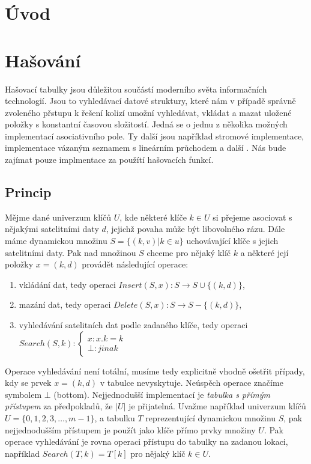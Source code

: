 
\chapter{Úvod}


\chapter{Hašování}
\label{sec:hashing}
Hašovací tabulky jsou důležitou součástí moderního světa informačních 
technologií. Jsou to vyhledávací datové struktury, které nám v případě
správně zvoleného přstupu k řešení kolizí umožní vyhledávat, vkládat a mazat uložené položky s konstantní
časovou složitostí. Jedná se o jednu z několika možných implementací
asociativního pole. Ty další jsou například stromové implementace, 
implementace vázaným seznamem s lineárním průchodem a další \cite{art_of_programming}. 
Nás bude zajímat pouze implmentace za použítí hašovacích funkcí.

\section{Princip}
Mějme dané univerzum klíčů $U$, kde některé klíče $k \in U$ si přejeme
asociovat s nějakými satelitními daty $d$, jejichž povaha může být libovolného rázu.
Dále máme dynamickou množinu $S = \{(k,v) | k \in u\}$
uchovávající klíče s jejich satelitními daty. Pak nad množinou $S$ chceme
pro nějaký klíč $k$ a některé její položky $x=(k, d)$ provádět následující 
operace: 

\begin{enumerate}
	\item vkládání dat, tedy operaci 
		$Insert(S,x) : S \to S \cup \{(k, d)\} $,

	\item mazání dat, tedy operaci 
		$Delete(S,x) : S \to S - \{(k, d)\}$,

	\item vyhledávání satelitních dat podle zadaného klíče,
		tedy operaci \newline $Search(S,k) : 
			\begin{cases}
				x 	: x.k = k \\
				\bot : jinak 
			\end{cases} $
\end{enumerate}

Operace vyhledávání není totální, musíme tedy explicitně vhodně ošetřit
případy, kdy se prvek $x=(k,d)$ v tabulce nevyskytuje. Neúspěch operace značíme symbolem
$\bot$ (bottom).
Nejjednodušší implementací je \textit{tabulka s přímým přístupem} za
předpokladů, že $|U|$ je přijatelná. Uvažme například univerzum
klíčů $U = \{0,1,2,3,\ldots,m-1\}$, a tabulku $T$ reprezentující
dynamickou množinu $S$, pak nejjednodušším přístupem je použít jako
klíče přímo prvky množiny $U$. Pak operace vyhledávání je rovna operaci
přístupu do tabulky na zadanou lokaci, například $Search(T,k) = T[k]$
pro nějaký klíč $k \in U$.

